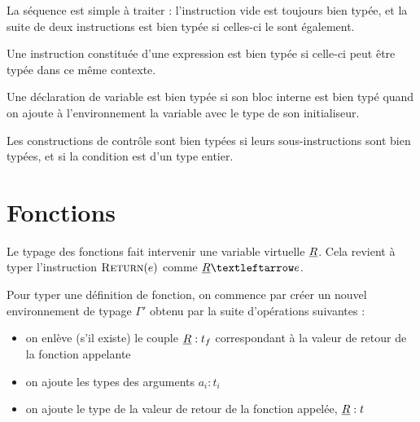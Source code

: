 La séquence est simple à traiter : l'instruction vide est toujours bien typée,
et la suite de deux instructions est bien typée si celles-ci le sont également.

\begin{mathpar}

\end{mathpar}

Une instruction constituée d'une expression est bien typée si celle-ci peut être
typée dans ce même contexte.

\begin{mathpar}
\end{mathpar}

Une déclaration de variable est bien typée si son bloc interne est bien typé
quand on ajoute à l'environnement la variable avec le type de son initialiseur.

\begin{mathpar}
\end{mathpar}

Les constructions de contrôle sont bien typées si leurs sous-instructions sont
bien typées, et si la condition est d'un type entier.

\begin{mathpar}

\end{mathpar}

\section{Fonctions}

Le typage des fonctions fait intervenir une variable virtuelle $\vRet$. Cela
revient à typer l'instruction $\iReturn{e}$ comme $\vRet ← e$.

\begin{mathpar}
\end{mathpar}

Pour typer une définition de fonction, on commence par créer un nouvel
environnement de typage $Γ'$ obtenu par la suite d'opérations suivantes :

\begin{itemize}
\item
  on enlève (s'il existe) le couple $\vRet : t_f$ correspondant à la
  valeur de retour de la fonction appelante
\item
  on ajoute les types des arguments $a_i : t_i$
\item
  on ajoute le type de la valeur de retour de la fonction appelée,
  $\vRet : t$
\end{itemize}

